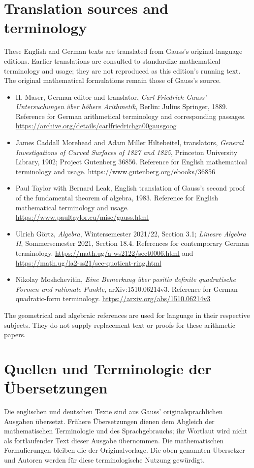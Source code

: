 \documentclass[11pt]{article}
\begin{document}
\raggedright
{}
\section*{Translation sources and terminology}
These English and German texts are translated from Gauss's original-language editions. Earlier translations are consulted to standardize mathematical terminology and usage; they are not reproduced as this edition's running text. The original mathematical formulations remain those of Gauss's source.
\begin{itemize}
\item H. Maser, German editor and translator, \emph{Carl Friedrich Gauss' Untersuchungen über höhere Arithmetik}, Berlin: Julius Springer, 1889. Reference for German arithmetical terminology and corresponding passages. \url{https://archive.org/details/carlfriedrichga00gausgoog}
\item James Caddall Morehead and Adam Miller Hiltebeitel, translators, \emph{General Investigations of Curved Surfaces of 1827 and 1825}, Princeton University Library, 1902; Project Gutenberg 36856. Reference for English mathematical terminology and usage. \url{https://www.gutenberg.org/ebooks/36856}
\item Paul Taylor with Bernard Leak, English translation of Gauss's second proof of the fundamental theorem of algebra, 1983. Reference for English mathematical terminology and usage. \url{https://www.paultaylor.eu/misc/gauss.html}
\item Ulrich Görtz, \emph{Algebra}, Wintersemester 2021/22, Section 3.1; \emph{Lineare Algebra II}, Sommersemester 2021, Section 18.4. References for contemporary German terminology. \url{https://math.ug/a-ws2122/sect0006.html} and \url{https://math.ug/la2-ss21/sec-quotient-ring.html}
\item Nikolay Moshchevitin, \emph{Eine Bemerkung über positiv definite quadratische Formen und rationale Punkte}, arXiv:1510.06214v3. Reference for German quadratic-form terminology. \url{https://arxiv.org/abs/1510.06214v3}
\end{itemize}
The geometrical and algebraic references are used for language in their respective subjects. They do not supply replacement text or proofs for these arithmetic papers.
\section*{Quellen und Terminologie der Übersetzungen}
Die englischen und deutschen Texte sind aus Gauss' originalsprachlichen Ausgaben übersetzt. Frühere Übersetzungen dienen dem Abgleich der mathematischen Terminologie und des Sprachgebrauchs; ihr Wortlaut wird nicht als fortlaufender Text dieser Ausgabe übernommen. Die mathematischen Formulierungen bleiben die der Originalvorlage. Die oben genannten Übersetzer und Autoren werden für diese terminologische Nutzung gewürdigt.
\end{document}
